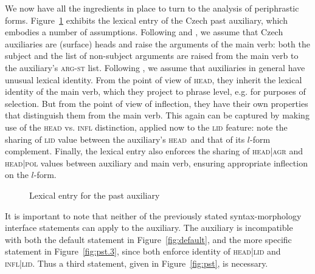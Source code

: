 \documentclass[output=paper]{langsci/langscibook}
\begin{document}
We now have all the ingredients in place to turn to the analysis of periphrastic forms. Figure~\ref{fig:LE:aux} exhibits the lexical entry of the Czech past auxiliary, which embodies a number of assumptions.  Following \citet{Hana07} and \citet{Petkevic15}, we assume that Czech auxiliaries are (surface) heads and raise the arguments of the main verb: both the subject  and the list of non-subject arguments  are raised from the main verb to the auxiliary's \textsc{arg-st} list. Following \citet{Bonami14d}, we assume that auxiliaries in general have unusual lexical identity. From the point of view of \textsc{head}, they inherit the lexical identity of the main verb, which they project to phrase level, e.g. for purposes of selection. But from the point of view of inflection, they have their own properties that distinguish them from the main verb. This again can be captured by making use of the \textsc{head} vs. \textsc{infl} distinction, applied now to the \textsc{lid} feature: note the sharing of \textsc{lid} value \avm{\2} between the auxiliary's \textsc{head} and that of its $l$-form complement. Finally, the lexical entry also enforces the sharing of \textsc{head|agr} and \textsc{head|pol} values between auxiliary and main verb, ensuring appropriate inflection on the $l$-form.

\begin{figure}
\caption{Lexical entry for the past auxiliary\label{fig:LE:aux}}
\end{figure}

It is important to note that neither of the previously stated syntax-morphology interface statements can apply to the auxiliary. The auxiliary is incompatible with both the default statement in Figure~\ref{fig:default}, and the more specific statement  in Figure~\ref{fig:pst.3}, since both enforce identity of \textsc{head|lid} and \textsc{infl|lid}. Thus a third statement, given in Figure~\ref{fig:pst}, is necessary. 
\end{document}
